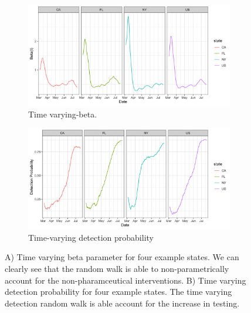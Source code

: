 \documentclass[11pt]{amsart}
\begin{document}
\begin{figure}
  \centering
     \begin{subfigure}{.5\textwidth}
  \centering
    \includegraphics[scale=.1]{beta_t_plot.png}
    \caption{Time varying-beta.}
\end{subfigure}%
\begin{subfigure}{.5\textwidth}
  \centering
    \includegraphics[scale=.1]{detection_plot.png}
    \caption{Time-varying detection probability}
\end{subfigure} 
 \caption{  A) Time varying beta parameter for four example states. We can clearly see that the random walk is able to non-parametrically account for the non-pharamceutical interventions. B) Time varying detection probability for four example states. The time varying detection random walk is able account for the increase in testing. }
\label{fig:model_details}
\end{figure}
\end{document}
